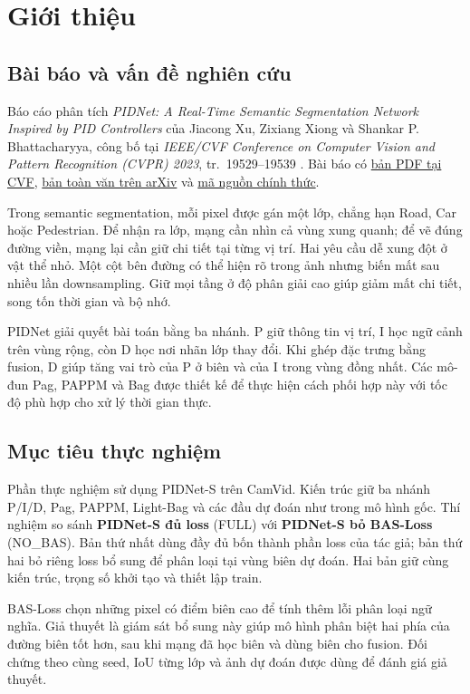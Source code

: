 \chapter{Giới thiệu}
\section{Bài báo và vấn đề nghiên cứu}
Báo cáo phân tích \emph{PIDNet: A Real-Time Semantic Segmentation Network Inspired by PID Controllers} của Jiacong Xu, Zixiang Xiong và Shankar P. Bhattacharyya, công bố tại \emph{IEEE/CVF Conference on Computer Vision and Pattern Recognition (CVPR) 2023}, tr.~19529--19539 \cite{pidnet}. Bài báo có \href{https://openaccess.thecvf.com/content/CVPR2023/papers/Xu_PIDNet_A_Real-Time_Semantic_Segmentation_Network_Inspired_by_PID_Controllers_CVPR_2023_paper.pdf}{bản PDF tại CVF}, \href{https://arxiv.org/abs/2206.02066}{bản toàn văn trên arXiv} và \href{https://github.com/XuJiacong/PIDNet}{mã nguồn chính thức}.

Trong semantic segmentation, mỗi pixel được gán một lớp, chẳng hạn Road, Car hoặc Pedestrian. Để nhận ra lớp, mạng cần nhìn cả vùng xung quanh; để vẽ đúng đường viền, mạng lại cần giữ chi tiết tại từng vị trí. Hai yêu cầu dễ xung đột ở vật thể nhỏ. Một cột bên đường có thể hiện rõ trong ảnh nhưng biến mất sau nhiều lần downsampling. Giữ mọi tầng ở độ phân giải cao giúp giảm mất chi tiết, song tốn thời gian và bộ nhớ.

PIDNet giải quyết bài toán bằng ba nhánh. P giữ thông tin vị trí, I học ngữ cảnh trên vùng rộng, còn D học nơi nhãn lớp thay đổi. Khi ghép đặc trưng bằng fusion, D giúp tăng vai trò của P ở biên và của I trong vùng đồng nhất. Các mô-đun Pag, PAPPM và Bag được thiết kế để thực hiện cách phối hợp này với tốc độ phù hợp cho xử lý thời gian thực.

\section{Mục tiêu thực nghiệm}
Phần thực nghiệm sử dụng PIDNet-S trên CamVid. Kiến trúc giữ ba nhánh P/I/D, Pag, PAPPM, Light-Bag và các đầu dự đoán như trong mô hình gốc. Thí nghiệm so sánh \textbf{PIDNet-S đủ loss} (FULL) với \textbf{PIDNet-S bỏ BAS-Loss} (NO\_BAS). Bản thứ nhất dùng đầy đủ bốn thành phần loss của tác giả; bản thứ hai bỏ riêng loss bổ sung để phân loại tại vùng biên dự đoán. Hai bản giữ cùng kiến trúc, trọng số khởi tạo và thiết lập train.

BAS-Loss chọn những pixel có điểm biên cao để tính thêm lỗi phân loại ngữ nghĩa. Giả thuyết là giám sát bổ sung này giúp mô hình phân biệt hai phía của đường biên tốt hơn, sau khi mạng đã học biên và dùng biên cho fusion. Đối chứng theo cùng seed, IoU từng lớp và ảnh dự đoán được dùng để đánh giá giả thuyết.
